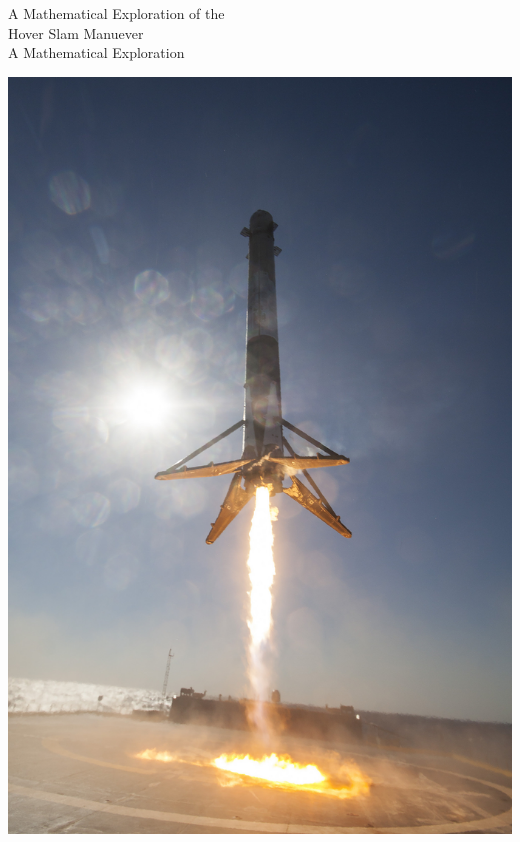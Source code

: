 \documentclass[12pt]{article}
\begin{document}
    
    \begin{titlepage}
        \begin{center}
            {\LARGE A Mathematical Exploration of the \\ Hover Slam Manuever}
            \break
            \\
            {\large A Mathematical Exploration}
            \break
            

            \vspace{14mm}
            \includegraphics[scale=0.17]{hoverslam2.jpg}
            

        \end{center}
    \end{titlepage}
\end{document}
